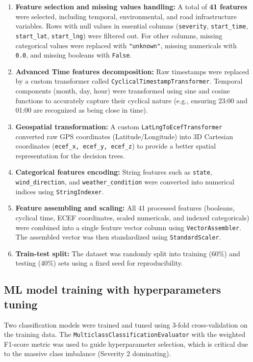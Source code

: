 \documentclass[11pt,a4paper]{article}
\begin{document}
\begin{enumerate}
    \item \textbf{Feature selection and missing values handling:} 
    A total of \textbf{41 features} were selected, including temporal, environmental, and road infrastructure variables. Rows with null values in essential columns (\texttt{severity}, \texttt{start\_time}, \texttt{start\_lat}, \texttt{start\_lng}) were filtered out. For other columns, missing categorical values were replaced with \texttt{"unknown"}, missing numericals with \texttt{0.0}, and missing booleans with \texttt{False}.
    
    \item \textbf{Advanced Time features decomposition:} 
    Raw timestamps were replaced by a custom transformer called \texttt{CyclicalTimestampTransformer}. Temporal components (month, day, hour) were transformed using sine and cosine functions to accurately capture their cyclical nature (e.g., ensuring 23:00 and 01:00 are recognized as being close in time).
    
    \item \textbf{Geospatial transformation:} 
    A custom \texttt{LatLngToEcefTransformer} converted raw GPS coordinates (Latitude/Longitude) into 3D Cartesian coordinates (\texttt{ecef\_x, ecef\_y, ecef\_z}) to provide a better spatial representation for the decision trees.
    
    \item \textbf{Categorical features encoding:} 
    String features such as \texttt{state}, \texttt{wind\_direction}, and \texttt{weather\_condition} were converted into numerical indices using \texttt{StringIndexer}.
    
    \item \textbf{Feature assembling and scaling:} 
    All 41 processed features (booleans, cyclical time, ECEF coordinates, scaled numericals, and indexed categoricals) were combined into a single feature vector column using \texttt{VectorAssembler}. The assembled vector was then standardized using \texttt{StandardScaler}.
    
    \item \textbf{Train-test split:} 
    The dataset was randomly split into training (60\%) and testing (40\%) sets using a fixed seed for reproducibility.
\end{enumerate}

\subsection*{ML model training with hyperparameters tuning}
Two classification models were trained and tuned using 3-fold cross-validation on the training data. The \texttt{MulticlassClassificationEvaluator} with the weighted F1-score metric was used to guide hyperparameter selection, which is critical due to the massive class imbalance (Severity 2 dominating).
\end{document}
